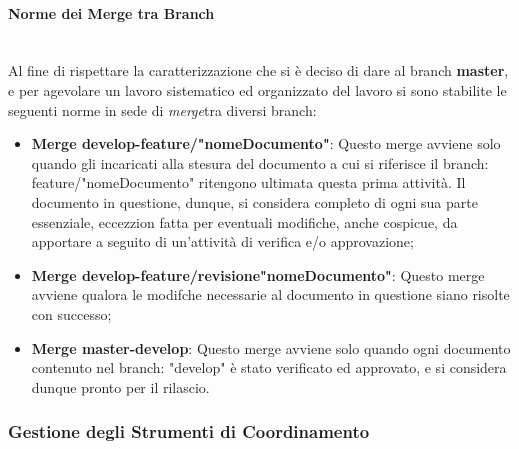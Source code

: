 \paragraph{Norme dei Merge tra Branch} ~\\
	Al fine di rispettare la caratterizzazione che si è deciso di dare al branch \textbf{master}, e per agevolare un lavoro sistematico ed organizzato del lavoro si sono stabilite le seguenti norme in sede di \textit{merge}\glossario tra diversi branch\glossario:
	\begin{itemize}
	\item \textbf{Merge develop-feature/"nomeDocumento"}: Questo merge avviene solo quando gli incaricati alla stesura del documento a cui si riferisce il branch: feature/"nomeDocumento" ritengono ultimata questa prima attività. Il documento in questione, dunque, si considera completo di ogni sua parte essenziale, eccezzion fatta per eventuali modifiche, anche cospicue, da apportare a seguito di un'attività di verifica e/o approvazione;
	\item \textbf{Merge develop-feature/revisione"nomeDocumento"}: Questo merge avviene qualora le modifche necessarie al documento in questione siano risolte con successo;
	\item \textbf{Merge master-develop}: Questo merge avviene solo quando ogni documento contenuto nel branch: "develop" è stato verificato ed approvato, e si considera dunque pronto per il rilascio.
	\end{itemize}


\subsubsection{Gestione degli Strumenti di Coordinamento}

